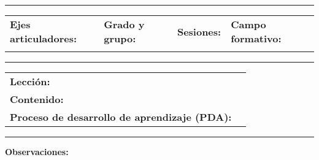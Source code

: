 \documentclass[11pt]{article}
\begin{document}
\vspace{0.2cm}
\hrule
\vspace{0.2cm}

\begin{tabularx}{\textwidth}{>{\centering\arraybackslash}X | >{\centering\arraybackslash}X | >{\centering\arraybackslash}X | >{\centering\arraybackslash}X}
    \textbf{Ejes articuladores:} & \textbf{Grado y grupo:} & \textbf{Sesiones:} & \textbf{Campo formativo:} \\
    \underline{\hspace{\fill}} & \underline{\hspace{\fill}} & \underline{\hspace{\fill}} & \underline{\hspace{\fill}} \\
\end{tabularx}

\vspace{0.2cm}
\hrule
\vspace{0.2cm}

\begin{tabularx}{\textwidth}{lX}
    \textbf{Lección:} & \underline{\hspace{\fill}} \\
    \textbf{Contenido:} & \underline{\hspace{\fill}} \\
    \textbf{Proceso de desarrollo de aprendizaje (PDA):} & \underline{\hspace{\fill}} \\
\end{tabularx}

\vspace{0.2cm}
\hrule
\vspace{0.2cm}

\textbf{Observaciones:}
\vspace{0.2cm}
\end{document}

